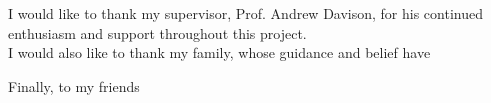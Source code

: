 I would like to thank my supervisor, Prof. Andrew Davison, for his continued enthusiasm and support throughout this project.\\

I would also like to thank my family, whose guidance and belief have    

Finally, to my friends
